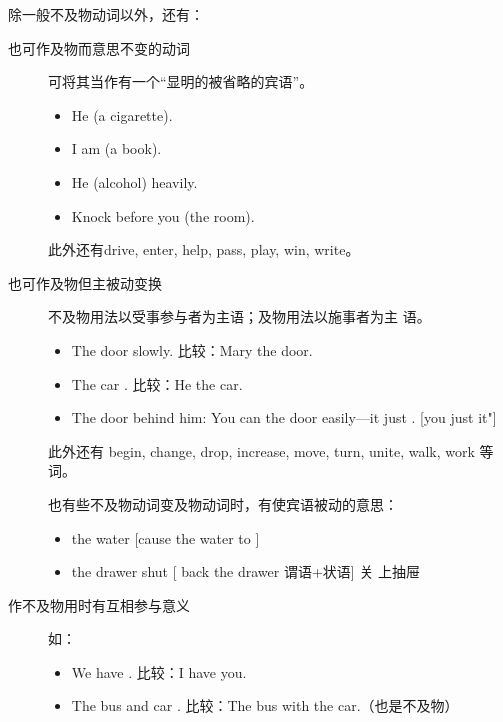 除一般不及物动词以外，还有：
\begin{description}
\item[也可作及物而意思不变的动词] 可将其当作有一个“显明的被省略的宾语”。
  \begin{itemize}
  \item He  (a cigarette).

  \item I am  (a book).

  \item He  (alcohol) heavily.

  \item Knock before you  (the room).
  \end{itemize}

  此外还有drive, enter, help, pass, play, win, write。

\item[也可作及物但主被动变换] 不及物用法以受事参与者为主语；及物用法以施事者为主
语。
  \begin{itemize}
  \item The door  slowly. 比较：Mary  the door.

  \item The car . 比较：He  the car.

  \item The door  behind him: You can  the door
easily---it just . [you just  it"]
\end{itemize}

此外还有 begin, change, drop, increase, move, turn, unite, walk, work 等词。

也有些不及物动词变及物动词时，有使宾语被动的意思：
\begin{itemize}
\item {} the water [cause the water to ]

\item {} the drawer shut [ back the drawer 谓语+状语] 关
  上抽屉
\end{itemize}

\item[作不及物用时有互相参与意义] 如：
  \begin{itemize}
  \item We have . 比较：I have  you.

  \item The bus and car . 比较：The bus  with the
    car.（也是不及物）
  \end{itemize}
\end{description}

